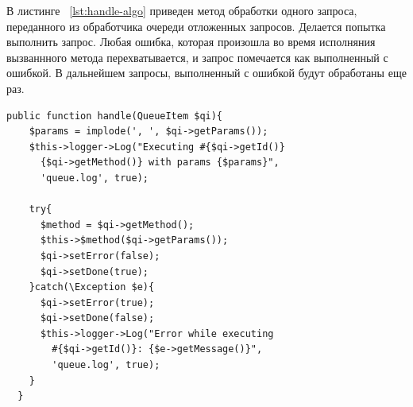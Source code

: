 В листинге ~\ref{lst:handle-algo} приведен метод обработки одного запроса, переданного из обработчика очереди отложенных запросов. Делается попытка выполнить запрос. Любая ошибка, которая произошла во время исполняния вызваннного метода перехватывается, и запрос помечается как выполненный с ошибкой. В дальнейшем запросы, выполненный с ошибкой будут обработаны еще раз.

\begin{lstlisting}[caption={Алгоритм обработки выбранного запроса}, label=lst:handle-algo]
  public function handle(QueueItem $qi){
    $params = implode(', ', $qi->getParams());
    $this->logger->Log("Executing #{$qi->getId()} 
      {$qi->getMethod()} with params {$params}", 
      'queue.log', true);

    try{
      $method = $qi->getMethod();
      $this->$method($qi->getParams());
      $qi->setError(false);
      $qi->setDone(true);
    }catch(\Exception $e){
      $qi->setError(true);
      $qi->setDone(false);
      $this->logger->Log("Error while executing 
        #{$qi->getId()}: {$e->getMessage()}", 
        'queue.log', true);
    }
  }
\end{lstlisting}  


\newpage